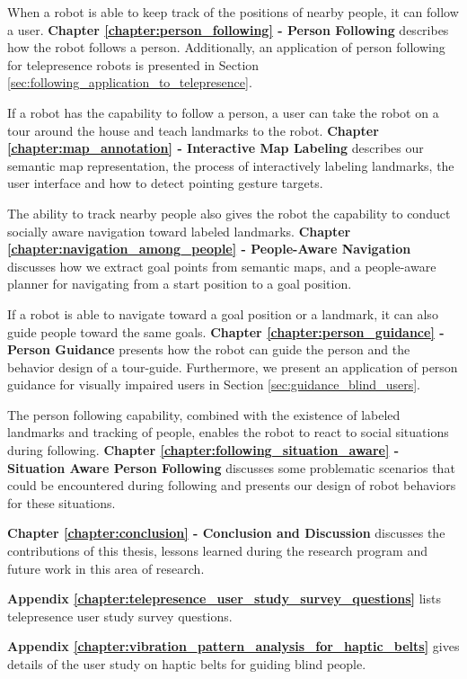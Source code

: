 When a robot is able to keep track of the positions of nearby people, it can follow a user. \textbf{Chapter \ref{chapter:person_following} - Person Following} describes how the robot follows a person. Additionally, an application of person following for telepresence robots is presented in Section \ref{sec:following_application_to_telepresence}.

If a robot has the capability to follow a person, a user can take the robot on a tour around the house and teach landmarks to the robot. \textbf{Chapter \ref{chapter:map_annotation} - Interactive Map Labeling} describes our semantic map representation, the process of interactively labeling landmarks, the user interface and how to detect pointing gesture targets.

The ability to track nearby people also gives the robot the capability to conduct socially aware navigation toward labeled landmarks. \textbf{Chapter \ref{chapter:navigation_among_people} - People-Aware Navigation} discusses how we extract goal points from semantic maps, and a people-aware planner for navigating from a start position to a goal position.

If a robot is able to navigate toward a goal position or a landmark, it can also guide people toward the same goals. \textbf{Chapter \ref{chapter:person_guidance} - Person Guidance} presents how the robot can guide the person and the behavior design of a tour-guide. Furthermore, we present an application of person guidance for visually impaired users in Section \ref{sec:guidance_blind_users}.

The person following capability, combined with the existence of labeled landmarks and tracking of people, enables the robot to react to social situations during following. \textbf{Chapter \ref{chapter:following_situation_aware} - Situation Aware Person Following} discusses some problematic scenarios that could be encountered during following and presents our design of robot behaviors for these situations.

\textbf{Chapter \ref{chapter:conclusion} - Conclusion and Discussion} discusses the contributions of this thesis, lessons learned during the research program and future work in this area of research.

\textbf{Appendix \ref{chapter:telepresence_user_study_survey_questions}} lists telepresence user study survey questions.

\textbf{Appendix \ref{chapter:vibration_pattern_analysis_for_haptic_belts}} gives details of the user study on haptic belts for guiding blind people.
